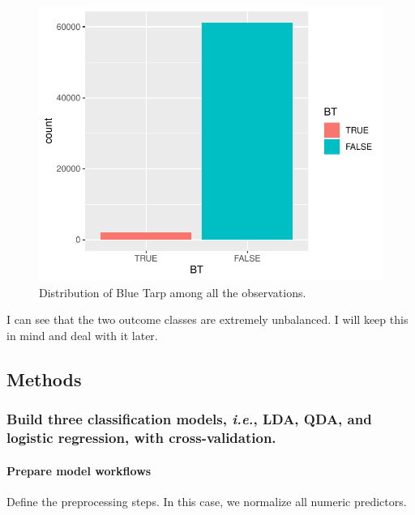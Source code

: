 \documentclass[
]{article}
\begin{document}
\begin{figure}[H]

{\centering \includegraphics[width=0.6\linewidth]{ProjectPart1_MERGED_files/figure-latex/unnamed-chunk-7-1} 

}

\caption{Distribution of Blue Tarp among all the observations.}\label{fig:unnamed-chunk-7}
\end{figure}

I can see that the two outcome classes are extremely unbalanced. I will
keep this in mind and deal with it later.

\hypertarget{methods}{%
\subsection{Methods}\label{methods}}

\hypertarget{build-three-classification-models-i.e.-lda-qda-and-logistic-regression-with-cross-validation.}{%
\subsubsection{\texorpdfstring{Build three classification models,
\emph{i.e.}, LDA, QDA, and logistic regression, with
cross-validation.}{Build three classification models, i.e., LDA, QDA, and logistic regression, with cross-validation.}}\label{build-three-classification-models-i.e.-lda-qda-and-logistic-regression-with-cross-validation.}}

\hypertarget{prepare-model-workflows}{%
\paragraph{Prepare model workflows}\label{prepare-model-workflows}}

Define the preprocessing steps. In this case, we normalize all numeric
predictors.
\end{document}

